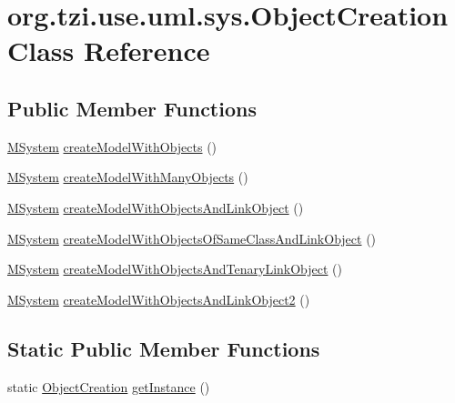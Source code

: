 \hypertarget{classorg_1_1tzi_1_1use_1_1uml_1_1sys_1_1_object_creation}{\section{org.\-tzi.\-use.\-uml.\-sys.\-Object\-Creation Class Reference}
\label{classorg_1_1tzi_1_1use_1_1uml_1_1sys_1_1_object_creation}
}
\subsection*{Public Member Functions}
\begin{DoxyCompactItemize}
\item 
\hyperlink{classorg_1_1tzi_1_1use_1_1uml_1_1sys_1_1_m_system}{M\-System} \hyperlink{classorg_1_1tzi_1_1use_1_1uml_1_1sys_1_1_object_creation_a2a48e285ddb69f0785e2c2cb77fa105c}{create\-Model\-With\-Objects} ()
\item 
\hyperlink{classorg_1_1tzi_1_1use_1_1uml_1_1sys_1_1_m_system}{M\-System} \hyperlink{classorg_1_1tzi_1_1use_1_1uml_1_1sys_1_1_object_creation_aa5e43d90d5b9a2e388cc394a694ddee2}{create\-Model\-With\-Many\-Objects} ()
\item 
\hyperlink{classorg_1_1tzi_1_1use_1_1uml_1_1sys_1_1_m_system}{M\-System} \hyperlink{classorg_1_1tzi_1_1use_1_1uml_1_1sys_1_1_object_creation_a69aa71a01f01609c35fb8db378c7cde0}{create\-Model\-With\-Objects\-And\-Link\-Object} ()
\item 
\hyperlink{classorg_1_1tzi_1_1use_1_1uml_1_1sys_1_1_m_system}{M\-System} \hyperlink{classorg_1_1tzi_1_1use_1_1uml_1_1sys_1_1_object_creation_aa3536018bf6347abf9332cff17891131}{create\-Model\-With\-Objects\-Of\-Same\-Class\-And\-Link\-Object} ()
\item 
\hyperlink{classorg_1_1tzi_1_1use_1_1uml_1_1sys_1_1_m_system}{M\-System} \hyperlink{classorg_1_1tzi_1_1use_1_1uml_1_1sys_1_1_object_creation_a591dc2a6b6b0941c345cf0bfe5f0c0df}{create\-Model\-With\-Objects\-And\-Tenary\-Link\-Object} ()
\item 
\hyperlink{classorg_1_1tzi_1_1use_1_1uml_1_1sys_1_1_m_system}{M\-System} \hyperlink{classorg_1_1tzi_1_1use_1_1uml_1_1sys_1_1_object_creation_a4c1be24c346411759fcfdff82f02c683}{create\-Model\-With\-Objects\-And\-Link\-Object2} ()
\end{DoxyCompactItemize}
\subsection*{Static Public Member Functions}
\begin{DoxyCompactItemize}
\item 
static \hyperlink{classorg_1_1tzi_1_1use_1_1uml_1_1sys_1_1_object_creation}{Object\-Creation} \hyperlink{classorg_1_1tzi_1_1use_1_1uml_1_1sys_1_1_object_creation_a5e3fbb5078a8adbd0b6530a3b34ef68e}{get\-Instance} ()
\end{DoxyCompactItemize}


